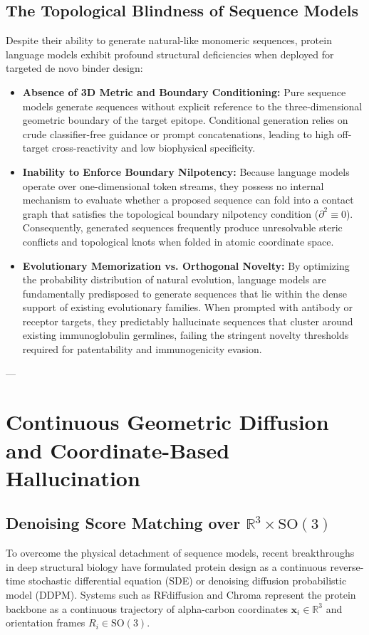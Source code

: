 \subsection{The Topological Blindness of Sequence Models}
Despite their ability to generate natural-like monomeric sequences, protein language models exhibit profound structural deficiencies when deployed for targeted de novo binder design:
\begin{itemize}[leftmargin=1.2cm]
    \item \textbf{Absence of 3D Metric and Boundary Conditioning:} Pure sequence models generate sequences without explicit reference to the three-dimensional geometric boundary of the target epitope. Conditional generation relies on crude classifier-free guidance or prompt concatenations, leading to high off-target cross-reactivity and low biophysical specificity.
    \item \textbf{Inability to Enforce Boundary Nilpotency:} Because language models operate over one-dimensional token streams, they possess no internal mechanism to evaluate whether a proposed sequence can fold into a contact graph that satisfies the topological boundary nilpotency condition ($\partial^2 \equiv 0$). Consequently, generated sequences frequently produce unresolvable steric conflicts and topological knots when folded in atomic coordinate space.
    \item \textbf{Evolutionary Memorization vs. Orthogonal Novelty:} By optimizing the probability distribution of natural evolution, language models are fundamentally predisposed to generate sequences that lie within the dense support of existing evolutionary families. When prompted with antibody or receptor targets, they predictably hallucinate sequences that cluster around existing immunoglobulin germlines, failing the stringent novelty thresholds required for patentability and immunogenicity evasion.
\end{itemize}

---

\section{Continuous Geometric Diffusion and Coordinate-Based Hallucination}
\label{sec:geometric_diffusion}

\subsection{Denoising Score Matching over $\mathbb{R}^3 \times \mathrm{SO}(3)$}
To overcome the physical detachment of sequence models, recent breakthroughs in deep structural biology have formulated protein design as a continuous reverse-time stochastic differential equation (SDE) or denoising diffusion probabilistic model (DDPM). Systems such as RFdiffusion \cite{watson2023novo} and Chroma \cite{ingraham2023illuminating} represent the protein backbone as a continuous trajectory of alpha-carbon coordinates $\mathbf{x}_i \in \mathbb{R}^3$ and orientation frames $R_i \in \mathrm{SO}(3)$.

